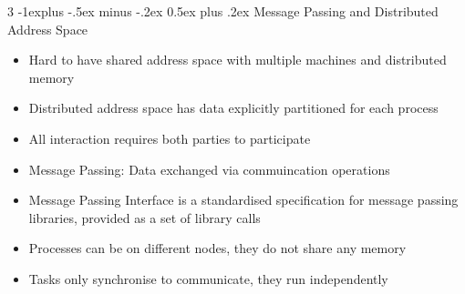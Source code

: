 \documentclass[10pt, landscape]{article}
\makeatletter
\renewcommand{\section}{\@startsection{section}{1}{0mm}%
                                {-1ex plus -.5ex minus -.2ex}%
                                {0.5ex plus .2ex}%
                                {\normalfont\large\bfseries}}
\renewcommand{\section}{\@startsection{section}{2}{0mm}%
                                {-1explus -.5ex minus -.2ex}%
                                {0.5ex plus .2ex}%
                                {\normalfont\normalsize\bfseries}}
\makeatother
\begin{document}
\begin{multicols*}{3}
\section{Message Passing and Distributed Address Space}
\begin{itemize}
    \item Hard to have shared address space with multiple machines and distributed memory
    \item Distributed address space has data explicitly partitioned for each process
    \item All interaction requires both parties to participate
    \item Message Passing: Data exchanged via commuincation operations
    \item Message Passing Interface is a standardised specification for message passing libraries, provided as a set of library calls
    \item Processes can be on different nodes, they do not share any memory
    \item Tasks only synchronise to communicate, they run independently
\end{itemize}


\end{multicols*}
\end{document}
